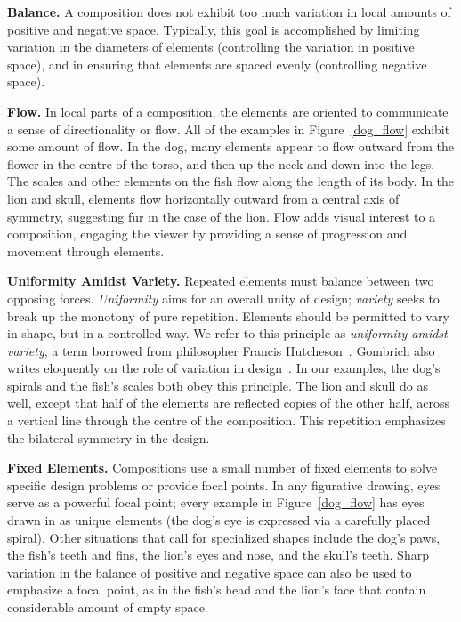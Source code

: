 \begin{items}%
\item \textbf{Balance.} A composition does not exhibit too
  much variation in local amounts of positive and negative space.
  Typically, this goal is accomplished by limiting variation in 
  the diameters of elements (controlling the variation in
  positive space), and in ensuring that elements are spaced 
  evenly (controlling negative space).

\item \textbf{Flow.} In local parts of a composition, the elements
  are oriented to communicate a sense of directionality or flow.
  All of the examples in Figure~\ref{dog_flow} exhibit 
  some amount of flow.  In the dog, many elements appear to flow
  outward from the flower in the centre of the torso, and then
  up the neck and down into the legs.  The scales and other elements
  on the fish flow along the length of its body.  In the lion and skull,
  elements flow horizontally outward from a central axis of symmetry,
  suggesting fur in the case of the lion.  
  Flow  adds visual interest to a composition, engaging the viewer 
  by providing a sense of progression and movement through elements.

\item \textbf{Uniformity Amidst Variety.} Repeated elements must balance
  between two opposing forces.  \textit{Uniformity} 
  aims for an overall unity of design; \textit{variety}
  seeks to break up the monotony of
  pure repetition.  Elements should be permitted to vary in shape,
  but in a controlled way.  We refer to this principle
  as \textit{uniformity amidst variety}, a term borrowed from 
  philosopher Francis Hutcheson~\cite{Hutcheson1729}.
  Gombrich also writes eloquently on the role of variation in 
  design~\cite{Gombrich}.
  In our examples, the dog's spirals and the
  fish's scales both obey this principle.  The lion and skull do as well,
  except that half of the elements are reflected copies of the other
  half, across a vertical line through the centre of the composition.
  This repetition emphasizes the bilateral symmetry in the design.

\item \textbf{Fixed Elements.} Compositions use a small number of fixed
  elements to solve specific design problems or provide focal points.
  In any figurative drawing, eyes serve as a powerful focal point;
  every example in Figure~\ref{dog_flow} has eyes drawn
  in as unique elements
  (the dog's eye is expressed via a carefully placed spiral).  Other
  situations that call for specialized shapes include the dog's paws,
  the fish's teeth and fins, 
  the lion's eyes and nose, %
  and the skull's teeth.
  Sharp variation in the balance of positive and negative space
  can also be used to emphasize a focal point,
  as in the fish's head and the lion's face that contain considerable amount of empty space.


\end{items}
